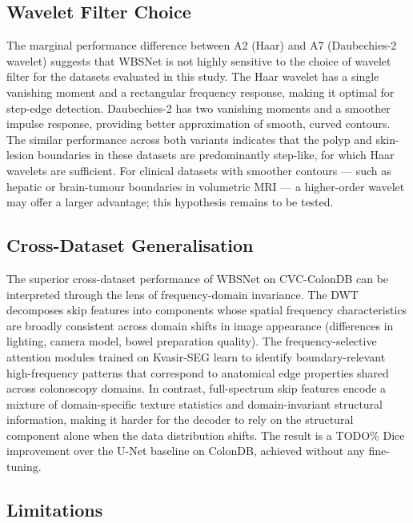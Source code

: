 \documentclass[journal]{IEEEtran}
\begin{document}
\subsection{Wavelet Filter Choice}

The marginal performance difference between A2 (Haar) and A7
(Daubechies-2 wavelet) suggests that WBSNet is not highly sensitive to the
choice of wavelet filter for the datasets evaluated in this study.
The Haar wavelet has a single vanishing moment and a rectangular frequency
response, making it optimal for step-edge detection.
Daubechies-2 has two vanishing moments and a smoother impulse response,
providing better approximation of smooth, curved contours.
The similar performance across both variants indicates that the polyp and
skin-lesion boundaries in these datasets are predominantly step-like, for
which Haar wavelets are sufficient.
For clinical datasets with smoother contours --- such as hepatic or
brain-tumour boundaries in volumetric MRI --- a higher-order wavelet may
offer a larger advantage; this hypothesis remains to be tested.

\subsection{Cross-Dataset Generalisation}

The superior cross-dataset performance of WBSNet on CVC-ColonDB can be
interpreted through the lens of frequency-domain invariance.
The DWT decomposes skip features into components whose spatial frequency
characteristics are broadly consistent across domain shifts in image
appearance (differences in lighting, camera model, bowel preparation quality).
The frequency-selective attention modules trained on Kvasir-SEG learn to
identify boundary-relevant high-frequency patterns that correspond to
anatomical edge properties shared across colonoscopy domains.
In contrast, full-spectrum skip features encode a mixture of
domain-specific texture statistics and domain-invariant structural
information, making it harder for the decoder to rely on the structural
component alone when the data distribution shifts.
The result is a TODO\% Dice improvement over the U-Net baseline on ColonDB,
achieved without any fine-tuning.

\subsection{Limitations}
\end{document}
